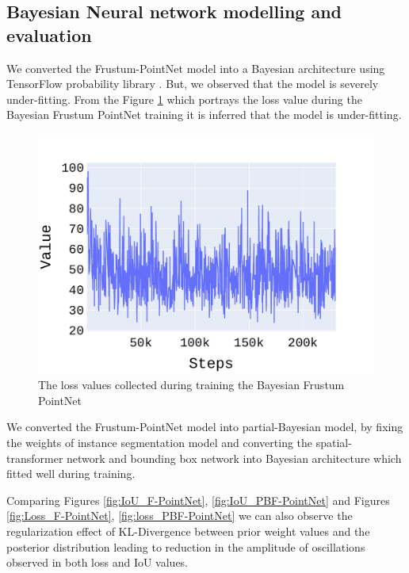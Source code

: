 \documentclass[10pt,twocolumn,letterpaper]{article}
\begin{document}
\subsection{Bayesian Neural network modelling and evaluation}
We converted the Frustum-PointNet model into a Bayesian architecture using TensorFlow probability library \cite{Tran2019}. But, we observed that the model is severely under-fitting. From the Figure \ref{fig:Loss_BF-PointNet} which portrays the loss value during the Bayesian Frustum PointNet training it is inferred that the model is under-fitting.

\begin{figure}[!htbp]
	\centering
	\includegraphics[scale = 0.4]{./images/loss.pdf}
	\caption{The loss values collected during training the Bayesian Frustum PointNet}
	\label{fig:Loss_BF-PointNet}
\end{figure}

We converted the Frustum-PointNet model into partial-Bayesian model, by fixing the weights of instance segmentation model and converting the spatial-transformer network and bounding box network into Bayesian architecture which fitted well during training. 

Comparing Figures \ref{fig:IoU_F-PointNet}, \ref{fig:IoU_PBF-PointNet} and Figures \ref{fig:Loss_F-PointNet}, \ref{fig:loss_PBF-PointNet} we can also observe the regularization effect of KL-Divergence between prior weight values and the posterior distribution leading to reduction in the amplitude of oscillations observed in both loss and IoU values.
\end{document}
